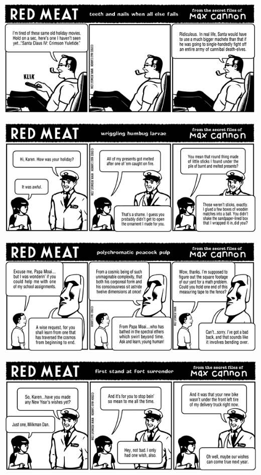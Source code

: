 \documentclass[a4paper,twoside,11pt]{article}
\begin{document}
\includegraphics[width=\textwidth]{redmeat_2003-12-23.png}



\includegraphics[width=\textwidth]{redmeat_2003-12-30.png}



\includegraphics[width=\textwidth]{redmeat_2004-01-06.png}



\includegraphics[width=\textwidth]{redmeat_2004-01-13.png}
\end{document}
